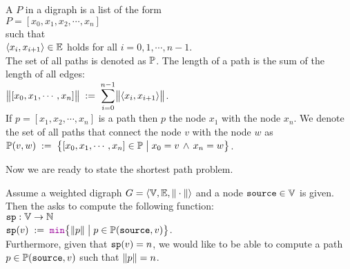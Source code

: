 \begin{Definition}
 A  $P$ in a digraph  is a list of the form 
\\[0.2cm]
\hspace*{1.3cm} 
$P = [ x_0, x_1, x_2, \cdots, x_n ]$ 
\\[0.2cm]
such that
\\[0.2cm]
\hspace*{1.3cm} $\pair(x_i,x_{i+1}) \in \edges$ \quad holds for all $i = 0, 1, \cdots, n-1$. 
\\[0.2cm]
The set of all paths is denoted as ${\mathbb P}$.
The length of a path is the sum of the length of all edges:
\\[0.2cm]
\hspace*{1.3cm}
$\ds\Weight{[x_0,x_1, \cdots, x_n]} \df \sum\limits_{i=0}^{n-1} \Weight{\pair(x_i,x_{i+1})}$. 
\\[0.2cm]
If  $p = [x_1, x_2, \cdots, x_n]$ is a path then  $p$   the node $x_1$ with the node
$x_n$.  We denote the set of all paths that connect the node $v$ with the node $w$ as
\\[0.2cm]
\hspace*{1.3cm} 
 ${\mathbb P}(v,w) \;:=\; \bigl\{ [x_0, x_1, \cdots, x_n] \in {\mathbb P} \bigm| x_0 = v \,\wedge\, x_n = w \bigr\}$.
\end{Definition}

\noindent
Now we are ready to state the shortest path problem.

\begin{Definition} \lb
  Assume a weighted digraph  
  $G = \langle {\mathbb V}, {\mathbb E}, \|\cdot\| \rangle$ 
  and a node $\mbox{\tt source} \in {\mathbb V}$ is given.  Then the  
  asks to compute the following function:
  \\[0.2cm]
  \hspace*{1.3cm} $\mathtt{sp}: {\mathbb V} \rightarrow {\mathbb N}$ \\[0.1cm]
  \hspace*{1.3cm} $\spath(v) \df \mytt{min}\bigl\{ \weight{p} \bigm| p \in \paths(\source,v) \bigr\}$.
  \\[0.2cm]
  Furthermore, given that $\mathtt{sp}(v) = n$, we would like to be able to compute a path 
  $p \in {\mathbb P}(\mbox{\tt source},v)$ such that $\|p\| = n$.
  \eox
\end{Definition}

